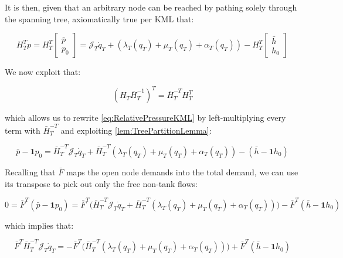 It is then, given that an arbitrary node can be reached by pathing solely through the spanning tree, axiomatically true per KML that:

\begin{equation}\label{eq:RelativePressureKML}
	H_T^T p = 
	H_T^T \begin{bmatrix} \bar{p} \\ p_0	\end{bmatrix} =
	\mathcal{J}_T\dot{q}_T + (\lambda_T(q_T)+\mu_T(q_T) + \alpha_T(q_T)) - 
	H_T^T \begin{bmatrix} \bar{h} \\ h_0	\end{bmatrix}
\end{equation}

We now exploit that:

\begin{equation}\label{eq:TreeLemmaRewrite}
	(H_T\bar{H}_T^{-1})^T = \bar{H}_T^{-T}H_T^T 
\end{equation}

which allows us to rewrite \cref{eq:RelativePressureKML} by left-multiplying every term with $\bar{H}_T^{-T}$ and exploiting \cref{lem:TreePartitionLemma}:

\begin{equation}\label{eq:RelativePressureKMLWithLemma}
	\bar{p} - \mathbf{1}p_0 =
	\bar{H}_T^{-T}\mathcal{J}_T\dot{q}_T + \bar{H}_T^{-T}(\lambda_T(q_T)+\mu_T(q_T) + \alpha_T(q_T)) - 
	(\bar{h} - \mathbf{1}h_0)
\end{equation}

Recalling that $\bar{F}$ maps the open node demands into the total demand, we can use its transpose to pick out only the free non-tank flows:

\begin{equation}\label{eq:RelativePressureLemmaAtmospheric}
	0 = \bar{F}^T(\bar{p} - \mathbf{1}p_0) =
	\bar{F}^T\Big(\bar{H}_T^{-T}\mathcal{J}_T\dot{q}_T + \bar{H}_T^{-T}(\lambda_T(q_T)+\mu_T(q_T) + \alpha_T(q_T))\Big) - 
	\bar{F}^T(\bar{h} - \mathbf{1}h_0)
\end{equation}

which implies that: 

\begin{equation}\label{eq:RelativePressureLemmaDiffEqForm}
	\bar{F}^T\bar{H}_T^{-T}\mathcal{J}_T\dot{q}_T = - \bar{F}^T\Big(\bar{H}_T^{-T}(\lambda_T(q_T)+\mu_T(q_T) + \alpha_T(q_T))\Big) + 
	\bar{F}^T(\bar{h} - \mathbf{1}h_0)
\end{equation}

